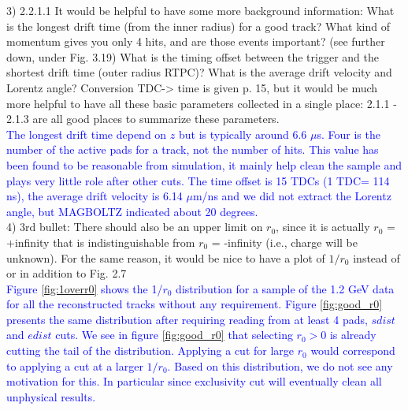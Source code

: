 3) 2.2.1.1 It would be helpful to have some more background information: What 
is the longest drift time (from the inner radius) for a good track? What kind 
of momentum gives you only 4 hits, and are those events important? (see further 
down, under Fig. 3.19) What is the timing offset between the trigger and the 
shortest drift time (outer radius RTPC)? What is the average drift velocity and 
Lorentz angle? Conversion TDC-> time is given p. 15, but it would be much more 
helpful to have all these basic parameters collected in a single place: 2.1.1 - 
2.1.3 are all good places to summarize these parameters.\\
\textcolor{blue}{
  The longest drift time depend on $z$ but is typically around 6.6 $\mu$s. 
  Four is the number of the active pads for a track, not the number of hits.  
  This value has been found to be reasonable from simulation, it mainly help 
  clean the sample and plays very little role after other cuts. The time offset 
  is 15 TDCs (1 TDC= 114 ns), the average drift velocity is 6.14 $\mu$m/ns and 
  we did not extract the Lorentz angle, but MAGBOLTZ indicated about 20 
  degrees.}\\

4) 3rd bullet: There should also be an upper limit on $r_0$, since it is 
actually $r_0$ = +infinity that is indistinguishable from $r_0$ = -infinity 
(i.e., charge will be unknown). For the same reason, it would be nice to have a 
plot of $1/r_0$ instead of or in addition to Fig. 2.7 \\
\textcolor{blue}{Figure \ref{fig:1overr0} shows the 1/$r_0$
   distribution for a sample of the 1.2 GeV data for all the reconstructed 
   tracks without any requirement. Figure \ref{fig:good_r0} presents the same 
   distribution after requiring reading from at least 4 pads, $sdist$ and 
   $edist$ cuts. We see in figure \ref{fig:good_r0} that selecting 
   $r_0>0$ is already cutting the tail of the distribution. Applying a cut for 
   large $r_0$ would correspond to applying a cut at a larger $1/r_0$. Based on this
   distribution, we do not see any motivation for this. In particular since exclusivity
   cut will eventually clean all unphysical results.}\\


